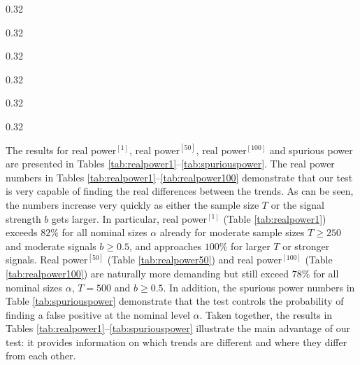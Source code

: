 \documentclass[12pt]{article}
\begin{document}
\begin{table}[t!]
\begin{subtable}[b]{0.32\textwidth}
\centering  
\caption{$b=0.25$}

\end{subtable}
\begin{subtable}[b]{0.32\textwidth}
\setcounter{subtable}{0}  
\centering  
\vspace{0.25cm} 
\caption{$b=0.5$}

\end{subtable}
\begin{subtable}[b]{0.32\textwidth}
\centering  
\vspace{0.25cm} \caption{$b=0.75$}

\end{subtable}
\vspace{0.5cm}

\caption{Spurious power of the multiscale test.}\label{tab:spuriouspower}
\vspace{-0.25cm}

\begin{subtable}[b]{0.32\textwidth}
\centering  
\caption{$b=0.25$}

\end{subtable}
\begin{subtable}[b]{0.32\textwidth}
\setcounter{subtable}{0}  
\centering  
\vspace{0.25cm} 
\caption{$b=0.5$}

\end{subtable}
\begin{subtable}[b]{0.32\textwidth}
\centering  
\vspace{0.25cm} 
\caption{$b=0.75$}

\end{subtable}

\end{table} 


The results for real power$^{[1]}$, real power$^{[50]}$, real power$^{[100]}$ and spurious power are presented in Tables \ref{tab:realpower1}--\ref{tab:spuriouspower}. 
The real power numbers in Tables \ref{tab:realpower1}--\ref{tab:realpower100} demonstrate that our test is very capable of finding the real differences between the trends. As can be seen, the numbers increase very quickly as either the sample size $T$ or the signal strength $b$ gets larger. In particular, real power$^{[1]}$ (Table \ref{tab:realpower1}) exceeds $82\%$ for all nominal sizes $\alpha$ already for moderate sample sizes $T\geq 250$ and moderate signals $b\geq 0.5$, and approaches $100\%$ for larger $T$ or stronger signals. Real power$^{[50]}$ (Table \ref{tab:realpower50}) and real power$^{[100]}$ (Table \ref{tab:realpower100}) are naturally more demanding but still exceed $78\%$ for all nominal sizes $\alpha$, $T=500$ and $b\geq 0.5$.
In addition, the spurious power numbers in Table \ref{tab:spuriouspower} demonstrate that the test controls the probability of finding a false positive at the nominal level $\alpha$. 
Taken together, the results in Tables \ref{tab:realpower1}--\ref{tab:spuriouspower} illustrate the main advantage of our test: it provides information on which trends are different and where they differ from each other. 
\end{document}
